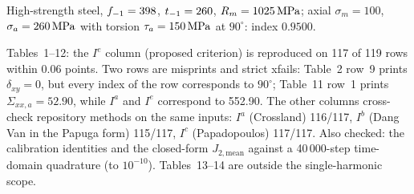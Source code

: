  High-strength steel, $f_{-1}=398$, $t_{-1}=260$, $R_m=1025\,\mathrm{MPa}$; axial
$\sigma_m=100$, $\sigma_a=260\,\mathrm{MPa}$ with torsion $\tau_a=150\,\mathrm{MPa}$ at $90^\circ$: index $0.9500$.

 Tables~1--12: the $I^e$ column (proposed criterion) is reproduced on 117 of 119
rows within 0.06 points. Two rows are misprints and strict xfails: Table~2 row~9 prints
$\delta_{xy}=0$, but every index of the row corresponds to $90^\circ$; Table~11 row~1 prints
$\Sigma_{xx,a}=52.90$, while $I^a$ and $I^e$ correspond to 552.90. The other columns cross-check
repository methods on the same inputs: $I^a$ (Crossland) 116/117, $I^b$ (Dang Van in the Papuga form)
115/117, $I^c$ (Papadopoulos) 117/117. Also checked: the calibration identities and the closed-form
$J_{2,\mathrm{mean}}$ against a 40\,000-step time-domain quadrature (to $10^{-10}$). Tables~13--14 are
outside the single-harmonic scope.
